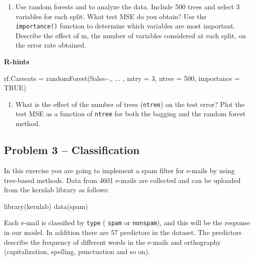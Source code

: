 \documentclass[
]{article}
\newenvironment{Shaded}{\begin{snugshade}}{\end{snugshade}}
\newcommand{\AttributeTok}[1]{\textcolor[rgb]{0.77,0.63,0.00}{#1}}
\newcommand{\ConstantTok}[1]{\textcolor[rgb]{0.00,0.00,0.00}{#1}}
\newcommand{\DecValTok}[1]{\textcolor[rgb]{0.00,0.00,0.81}{#1}}
\newcommand{\FunctionTok}[1]{\textcolor[rgb]{0.00,0.00,0.00}{#1}}
\newcommand{\NormalTok}[1]{#1}
\newcommand{\OtherTok}[1]{\textcolor[rgb]{0.56,0.35,0.01}{#1}}
\newcommand{\SpecialCharTok}[1]{\textcolor[rgb]{0.00,0.00,0.00}{#1}}
\providecommand{\tightlist}{%
  \setlength{\itemsep}{0pt}\setlength{\parskip}{0pt}}
\begin{document}
\begin{enumerate}
\def\labelenumi{\alph{enumi})}
\setcounter{enumi}{4}
\tightlist
\item
  Use random forests and to analyze the data. Include 500 trees and
  select 3 variables for each split. What test MSE do you obtain? Use
  the \texttt{importance()} function to determine which variables are
  most important. Describe the effect of m, the number of variables
  considered at each split, on the error rate obtained.
\end{enumerate}

\textbf{R-hints}

\begin{Shaded}
\begin{Highlighting}[]
\NormalTok{rf.Carseats }\OtherTok{=} \FunctionTok{randomForest}\NormalTok{(Sales}\SpecialCharTok{\textasciitilde{}}\NormalTok{., ... , }\AttributeTok{mtry =} \DecValTok{3}\NormalTok{, }\AttributeTok{ntree =} \DecValTok{500}\NormalTok{, }\AttributeTok{importance =} \ConstantTok{TRUE}\NormalTok{)}
\end{Highlighting}
\end{Shaded}

\begin{enumerate}
\def\labelenumi{\alph{enumi})}
\setcounter{enumi}{5}
\tightlist
\item
  What is the effect of the number of trees (\texttt{ntree}) on the test
  error? Plot the test MSE as a function of \texttt{ntree} for both the
  bagging and the random forest method.
\end{enumerate}

\hypertarget{problem-3-classification}{%
\subsection{Problem 3 --
Classification}\label{problem-3-classification}}

In this exercise you are going to implement a spam filter for e-mails by
using tree-based methods. Data from 4601 e-mails are collected and can
be uploaded from the kernlab library as follows:

\begin{Shaded}
\begin{Highlighting}[]
\FunctionTok{library}\NormalTok{(kernlab)}
\FunctionTok{data}\NormalTok{(spam)}
\end{Highlighting}
\end{Shaded}

Each e-mail is classified by \texttt{type} ( \texttt{spam} or
\texttt{nonspam}), and this will be the response in our model. In
addition there are 57 predictors in the dataset. The predictors describe
the frequency of different words in the e-mails and orthography
(capitalization, spelling, punctuation and so on).
\end{document}
